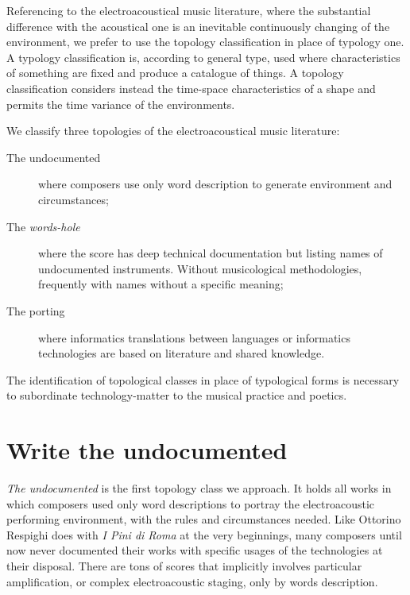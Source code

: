 \documentclass[twoside,a4paper]{article}
\begin{document}
Referencing to the electroacoustical music literature, where the substantial difference with the acoustical one is an inevitable continuously changing of the environment, we prefer to use the topology classification in place of typology one. A typology classification is, according to general type, used where characteristics of something are fixed and produce a catalogue of things. A topology classification considers instead the time-space characteristics of a shape and permits the time variance of the environments.

We classify three topologies of the electroacoustical music literature:

\begin{description}
  \item[The undocumented] where composers use only word description to generate environment and circumstances;
  \item[The \emph{words-hole}] where the score has deep technical documentation but listing names of undocumented instruments. Without musicological methodologies, frequently with names without a specific meaning;
  \item[The porting] where informatics translations between languages or informatics technologies are based on literature and shared knowledge.
\end{description}

The identification of topological classes in place of typological forms is necessary to subordinate technology-matter to the musical practice and poetics. %


\section{Write the undocumented}
\label{sec:writing}

\emph{The undocumented} is the first topology class we approach. It holds all works in which composers used only word descriptions to portray the electroacoustic performing environment, with the rules and circumstances needed. Like Ottorino Respighi does with \emph{I Pini di Roma} \cite{ropr25} at the very beginnings, many composers until now never documented their works with specific usages of the technologies at their disposal. There are tons of scores that implicitly involves particular amplification, or complex electroacoustic staging, only by words description. 
\end{document}
